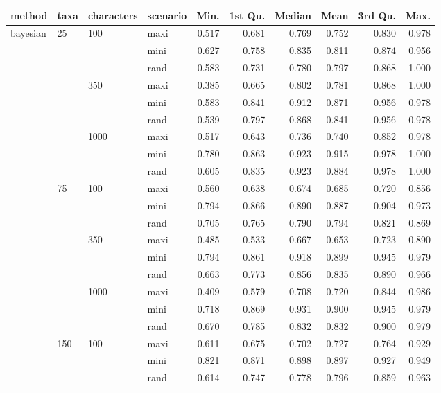 \begin{table}[ht]
\centering
\begin{tabular}{llllrrrrrr}
  \hline
method & taxa & characters & scenario & Min. & 1st Qu. & Median & Mean & 3rd Qu. & Max. \\ 
  \hline
bayesian & 25 & 100 & maxi & 0.517 & 0.681 & 0.769 & 0.752 & 0.830 & 0.978 \\ 
   &  &  & mini & 0.627 & 0.758 & 0.835 & 0.811 & 0.874 & 0.956 \\ 
   &  &  & rand & 0.583 & 0.731 & 0.780 & 0.797 & 0.868 & 1.000 \\ 
   &  & 350 & maxi & 0.385 & 0.665 & 0.802 & 0.781 & 0.868 & 1.000 \\ 
   &  &  & mini & 0.583 & 0.841 & 0.912 & 0.871 & 0.956 & 0.978 \\ 
   &  &  & rand & 0.539 & 0.797 & 0.868 & 0.841 & 0.956 & 0.978 \\ 
   &  & 1000 & maxi & 0.517 & 0.643 & 0.736 & 0.740 & 0.852 & 0.978 \\ 
   &  &  & mini & 0.780 & 0.863 & 0.923 & 0.915 & 0.978 & 1.000 \\ 
   &  &  & rand & 0.605 & 0.835 & 0.923 & 0.884 & 0.978 & 1.000 \\ 
   & 75 & 100 & maxi & 0.560 & 0.638 & 0.674 & 0.685 & 0.720 & 0.856 \\ 
   &  &  & mini & 0.794 & 0.866 & 0.890 & 0.887 & 0.904 & 0.973 \\ 
   &  &  & rand & 0.705 & 0.765 & 0.790 & 0.794 & 0.821 & 0.869 \\ 
   &  & 350 & maxi & 0.485 & 0.533 & 0.667 & 0.653 & 0.723 & 0.890 \\ 
   &  &  & mini & 0.794 & 0.861 & 0.918 & 0.899 & 0.945 & 0.979 \\ 
   &  &  & rand & 0.663 & 0.773 & 0.856 & 0.835 & 0.890 & 0.966 \\ 
   &  & 1000 & maxi & 0.409 & 0.579 & 0.708 & 0.720 & 0.844 & 0.986 \\ 
   &  &  & mini & 0.718 & 0.869 & 0.931 & 0.900 & 0.945 & 0.979 \\ 
   &  &  & rand & 0.670 & 0.785 & 0.832 & 0.832 & 0.900 & 0.979 \\ 
   & 150 & 100 & maxi & 0.611 & 0.675 & 0.702 & 0.727 & 0.764 & 0.929 \\ 
   &  &  & mini & 0.821 & 0.871 & 0.898 & 0.897 & 0.927 & 0.949 \\ 
   &  &  & rand & 0.614 & 0.747 & 0.778 & 0.796 & 0.859 & 0.963 \\ 

\end{tabular}
\end{table}
